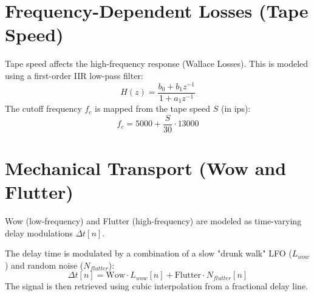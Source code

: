 \documentclass[11pt,a4paper]{article}
\begin{document}
\section{Frequency-Dependent Losses (Tape Speed)}
Tape speed affects the high-frequency response (Wallace Losses). This is modeled using a first-order IIR low-pass filter:
\begin{equation}
H(z) = \frac{b_0 + b_1 z^{-1}}{1 + a_1 z^{-1}}
\end{equation}
The cutoff frequency $f_c$ is mapped from the tape speed $S$ (in ips):
\begin{equation}
f_c = 5000 + \frac{S}{30} \cdot 13000
\end{equation}

\section{Mechanical Transport (Wow and Flutter)}
Wow (low-frequency) and Flutter (high-frequency) are modeled as time-varying delay modulations $\Delta t[n]$.

The delay time is modulated by a combination of a slow "drunk walk" LFO ($L_{wow}$) and random noise ($N_{flutter}$):
\begin{equation}
\Delta t[n] = \text{Wow} \cdot L_{wow}[n] + \text{Flutter} \cdot N_{flutter}[n]
\end{equation}
The signal is then retrieved using cubic interpolation from a fractional delay line.
\end{document}
